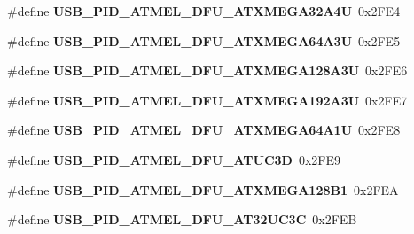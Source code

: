 \begin{DoxyCompactItemize}
\#define {\bfseries U\+S\+B\+\_\+\+P\+I\+D\+\_\+\+A\+T\+M\+E\+L\+\_\+\+D\+F\+U\+\_\+\+A\+T\+X\+M\+E\+G\+A32\+A4U}~0x2\+F\+E4
\item 
\mbox{\label{group__usb__atmel__ids__group_ga374d6e128a64f6b52c6b9c5809701d24}} 
\#define {\bfseries U\+S\+B\+\_\+\+P\+I\+D\+\_\+\+A\+T\+M\+E\+L\+\_\+\+D\+F\+U\+\_\+\+A\+T\+X\+M\+E\+G\+A64\+A3U}~0x2\+F\+E5
\item 
\mbox{\label{group__usb__atmel__ids__group_gad10a76aa20fb47cf4178028113ddd4af}} 
\#define {\bfseries U\+S\+B\+\_\+\+P\+I\+D\+\_\+\+A\+T\+M\+E\+L\+\_\+\+D\+F\+U\+\_\+\+A\+T\+X\+M\+E\+G\+A128\+A3U}~0x2\+F\+E6
\item 
\mbox{\label{group__usb__atmel__ids__group_ga07263949c78e1e62f7fa2f29569edb9f}} 
\#define {\bfseries U\+S\+B\+\_\+\+P\+I\+D\+\_\+\+A\+T\+M\+E\+L\+\_\+\+D\+F\+U\+\_\+\+A\+T\+X\+M\+E\+G\+A192\+A3U}~0x2\+F\+E7
\item 
\mbox{\label{group__usb__atmel__ids__group_gae520bc39b665f0aeeaa860c9800eb511}} 
\#define {\bfseries U\+S\+B\+\_\+\+P\+I\+D\+\_\+\+A\+T\+M\+E\+L\+\_\+\+D\+F\+U\+\_\+\+A\+T\+X\+M\+E\+G\+A64\+A1U}~0x2\+F\+E8
\item 
\mbox{\label{group__usb__atmel__ids__group_ga173d2e0215c7d3184388097e541e8dad}} 
\#define {\bfseries U\+S\+B\+\_\+\+P\+I\+D\+\_\+\+A\+T\+M\+E\+L\+\_\+\+D\+F\+U\+\_\+\+A\+T\+U\+C3D}~0x2\+F\+E9
\item 
\mbox{\label{group__usb__atmel__ids__group_ga11edf2d64801564a813466783f142fec}} 
\#define {\bfseries U\+S\+B\+\_\+\+P\+I\+D\+\_\+\+A\+T\+M\+E\+L\+\_\+\+D\+F\+U\+\_\+\+A\+T\+X\+M\+E\+G\+A128\+B1}~0x2\+F\+EA
\item 
\mbox{\label{group__usb__atmel__ids__group_ga59330b9a02bf3b9bea68ee373183e041}} 
\#define {\bfseries U\+S\+B\+\_\+\+P\+I\+D\+\_\+\+A\+T\+M\+E\+L\+\_\+\+D\+F\+U\+\_\+\+A\+T32\+U\+C3C}~0x2\+F\+EB
\item 
\mbox{\label{group__usb__atmel__ids__group_ga1b491076e809556bea90da42d556a4e7}} 

\end{DoxyCompactItemize}
